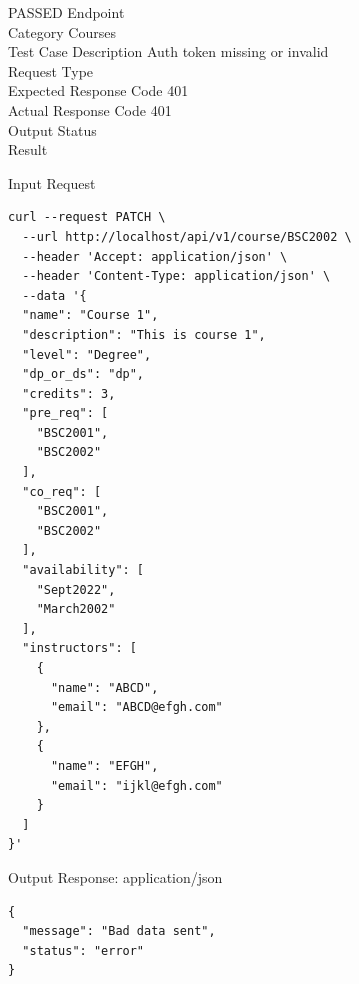 \begin{testcase}{66}{PASSED}
Endpoint \hfill {}\\
Category \hfill Courses\\
Test Case Description \hfill Auth token missing or invalid\\

Request Type    \hfill {}\\
Expected Response Code    \hfill 401\\
Actual Response Code    \hfill 401\\

Output Status \hfill {}\\
Result \hfill {}

\begin{ipblock}{Input Request}
\begin{verbatim}
curl --request PATCH \
  --url http://localhost/api/v1/course/BSC2002 \
  --header 'Accept: application/json' \
  --header 'Content-Type: application/json' \
  --data '{
  "name": "Course 1",
  "description": "This is course 1",
  "level": "Degree",
  "dp_or_ds": "dp",
  "credits": 3,
  "pre_req": [
    "BSC2001",
    "BSC2002"
  ],
  "co_req": [
    "BSC2001",
    "BSC2002"
  ],
  "availability": [
    "Sept2022",
    "March2002"
  ],
  "instructors": [
    {
      "name": "ABCD",
      "email": "ABCD@efgh.com"
    },
    {
      "name": "EFGH",
      "email": "ijkl@efgh.com"
    }
  ]
}'
\end{verbatim}
\end{ipblock}

\begin{opblock}{Output Response: application/json}
\begin{verbatim}
{
  "message": "Bad data sent",
  "status": "error"
}
\end{verbatim}
\end{opblock}
\end{testcase}

